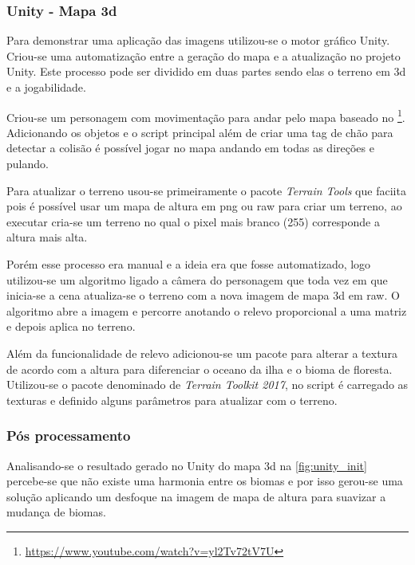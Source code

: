 \subsubsection{Unity - Mapa 3d}

Para demonstrar uma aplicação das imagens utilizou-se o motor gráfico Unity. Criou-se uma automatização entre a geração do mapa e a atualização no projeto Unity. Este processo pode ser dividido em duas partes sendo elas o terreno em 3d e a jogabilidade.


Criou-se um personagem com movimentação para andar pelo mapa baseado no \footnote{\url{https://www.youtube.com/watch?v=yl2Tv72tV7U}}. Adicionando os objetos e o script principal além de criar uma tag de chão para detectar a colisão é possível jogar no mapa andando em todas as direções e pulando.

 Para atualizar o terreno usou-se primeiramente o pacote \textit{Terrain Tools} que faciita pois é possível usar um mapa de altura em png ou raw para criar um terreno, ao executar cria-se um terreno no qual o pixel mais branco (255) corresponde a altura mais alta.

 Porém esse processo era manual e a ideia era que fosse automatizado, logo utilizou-se um algoritmo ligado a câmera do personagem que toda vez em que inicia-se a cena atualiza-se o terreno com a nova imagem de mapa 3d em raw. O algoritmo abre a imagem e percorre anotando o relevo proporcional a uma matriz e depois aplica no terreno.

 Além da funcionalidade de relevo adicionou-se um pacote para alterar a textura de acordo com a altura para diferenciar o oceano da ilha e o bioma de floresta. Utilizou-se o pacote denominado de \textit{Terrain Toolkit 2017}, no script é carregado as texturas e definido alguns parâmetros para atualizar com o terreno.

\subsubsection{Pós processamento}
Analisando-se o resultado gerado no Unity do mapa 3d na \cref{fig:unity_init} percebe-se que não existe uma harmonia entre os biomas e por isso gerou-se uma solução aplicando um desfoque na imagem de mapa de altura para suavizar a mudança de biomas.

